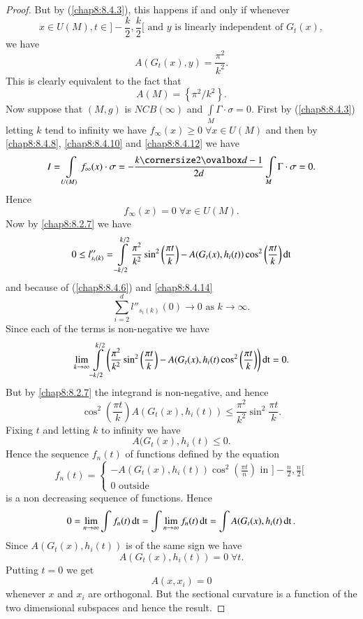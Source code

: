 \begin{proof}
But by (\ref{chap8:8.4.3}), this happens if and only if whenever
$$
x\in U(M),t\in]-\frac{k}{2},\frac{k}{2}[\text{ and $y$ is linearly
      independent of } G_{t}(x),
$$
we have
$$
A(G_{t}(x),y)=\frac{\pi^{2}}{k^{2}}.
$$
This is clearly equivalent to the fact that
$$
A(M)=\left\{\pi^{2}/k^{2}\right\}.
$$
Now suppose that $(M,g)$ is $NCB(\infty)$ and
$\int\limits_{M}\Gamma\cdot\sigma=0$. First by (\ref{chap8:8.4.3})
letting $k$ tend to infinity we have $f_{\infty}(x)\geq 0 \; \forall x\in
U(M)$ and then by \eqref{chap8:8.4.8}, \eqref{chap8:8.4.10} and \eqref{chap8:8.4.12} we
have
$$
I=\int\limits_{U(M)}f_{\infty}(x)\cdot
\sigma=-\frac{k\oval{d-1}}{2d}\int\limits_{M}\Gamma\cdot \sigma=0.
$$
Hence 
\begin{equation*}
f_{\infty}(x)=0 \; \forall x\in U(M).\tag{8.4.14}\label{chap8:8.4.14}
\end{equation*}
Now by \eqref{chap8:8.2.7} we have
$$
0\leq 
l''_{s_{i}(k)} = \int\limits^{k/2}_{-k/2} \frac{\pi^{2}}{k^{2}}
\sin^{2} \left(\frac{\pi t}{k}\right) -
A(G_{t}(x),h_{i}(t))\cos^{2}\left(\frac{\pi t}{k}\right)\operatorname{dt}   
$$
and \pageoriginale because of (\ref{chap8:8.4.6}) and \eqref{chap8:8.4.14}
$$
\sum^{d}_{i=2}l''_{s_{i}(k)}(0)\to 0\text{ \ as \ } k\to \infty.
$$ 
Since each of the terms is non-negative we have
$$
\lim\limits_{k\to
  \infty}\int\limits^{k/2}_{-k/2}\left(\frac{\pi^{2}}{k^{2}}\sin^{2}\left(\frac{\pi
  t}{k}\right)-A(G_{t}(x),h_{i}(t)\cos^{2}\left(\frac{\pi t}{k}\right)\right)\operatorname{dt}=0. 
$$
But by \eqref{chap8:8.2.7} the integrand is non-negative, and hence
$$
\cos^{2}\left(\frac{\pi t}{k}\right)A(G_{t}(x), h_{i}(t))\leq
\frac{\pi^{2}}{k^{2}}\sin^{2}\frac{\pi t}{k}.
$$
Fixing $t$ and letting $k$ to infinity we have
$$
A(G_{t}(x),h_{i}(t)\leq 0.
$$
Hence the sequence $f_{n}(t)$ of functions defined by the equation
$$
f_{n}(t)=
\begin{cases}
-A(G_{t}(x),h_{i}(t))\cos^{2}\left(\frac{\pi t}{n}\right)\text{ in
  }]-\frac{n}{2},\frac{n}{2}[\\
0\text{ outside}
\end{cases}
$$
is a non decreasing sequence of functions. Hence
$$
0=\lim\limits_{n\to \infty}\int f_{n}(t)\operatorname{dt}=\int\lim\limits_{n\to
  \infty}f_{n}(t)\operatorname{dt}=\int A(G_{t}(x),h_{i}(t)\operatorname{dt}.
$$
Since $A(G_{t}(x), h_{i}(t))$ is of the same sign we have
$$
A(G_{t}(x), h_{i}(t))=0 \; \forall t.
$$
Putting $t=0$ we get
$$
A(x,x_{i})=0
$$
whenever $x$ and $x_{i}$ are orthogonal. But the sectional curvature
is a function of the two dimensional subspaces and hence the result.
\end{proof}

